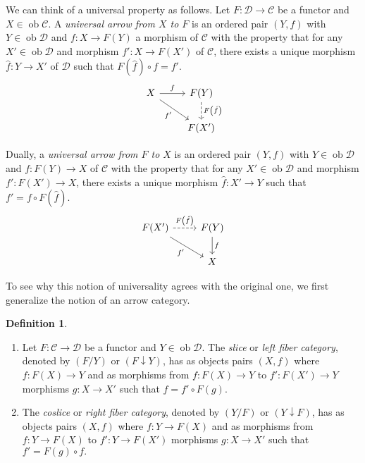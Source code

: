 \documentclass[10pt,letterpaper,cm]{nupset}
\theoremstyle{definition}
\newtheorem{definition}{Definition}[section]
\theoremstyle{theorem}
\theoremstyle{remark}
\newcommand{\1}{\mathbf{1}}
\renewcommand{\c}{\mathscr{C}}
\renewcommand{\d}{\mathscr{D}}
\newcommand{\0}{\vec 0}
\DeclareMathOperator{\ob}{ob}
\begin{document}
We can think of a universal property as follows.  Let $F : \d \to \c$ be a functor and $X \in \ob \c$. A \textit{universal arrow from $X$ to $F$} is an ordered pair $\left(Y, f\right)$ with $Y \in \ob \d$ and $f : X \to F(Y)$ a morphism of $\c$ with the property that for any $X' \in \ob \d$ and morphism $f' : X \to F(X')$ of $\c$, there exists a unique morphism $\hat{f} : Y \to X'$ of $\d$ such that $F\left(\hat{f}\right) \circ f = f'$.
\[ \begin{tikzcd}
X \arrow[r, "f"] \arrow[swap, dr,  " f' "] & F(Y) \arrow[d, dashed, "F\left(\hat{f}\right)"] \\%
 & F(X')
\end{tikzcd}
\]

Dually, a \textit{universal arrow from $F$ to $X$} is an ordered pair $\left(Y, f\right)$ with $Y \in \ob \d$ and $f: F(Y) \to X$ of $\c$ with the property that for any $X' \in \ob \d$ and morphism $f' : F(X') \to X$, there exists a unique morphism $\hat{f}: X' \to Y$ such that $f' = f \circ F\left(\hat{f}\right)$.
\[ \begin{tikzcd}
F(X') \arrow[r, dashed, "F\left(\hat{f}\right)"] \arrow[swap, dr,  " f' "] & F(Y) \arrow[d, "f"] \\%
 & X
\end{tikzcd}
\]



To see why this notion of universality agrees with the original one, we first generalize the notion of an arrow category.

\begin{definition} $ $
\begin{enumerate}
\item Let $F: \c \to \d$ be a functor and $Y \in \ob \d$. The \textit{slice} or \textit{left fiber category}, denoted by $\left(F/Y\right)$ or $\left(F \downarrow Y\right)$, has as objects pairs $\left(X, f\right)$ where $f: F(X) \to Y$ and as morphisms from $f : F(X) \to Y$ to $f' : F(X') \to Y$ morphisms $g : X \to X'$ such that $f = f' \circ F(g).$ 
\item 
The \textit{coslice} or \textit{right fiber category}, denoted by $\left(Y/F\right)$ or $\left(Y \downarrow F\right)$, has as objects pairs $\left(X, f\right)$ where $f: Y\to F(X)$ and as morphisms from $f :  Y \to F(X)$ to $f' : Y \to F(X')$ morphisms $g : X \to X'$ such that $f' = F(g) \circ f.$
\end{enumerate}
\end{definition}
\end{document}
